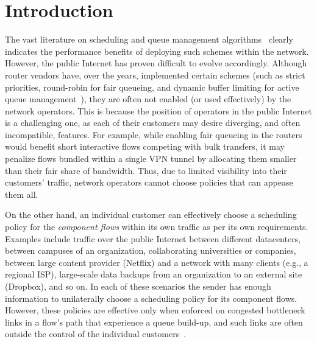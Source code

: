 \section{Introduction}\label{s:intro}



The vast literature on scheduling and queue management algorithms~\cite{diffserv, fair-queueing, sfq, pie, CoDel, fifoplus, virtualClocks, csfq, drr, red, ecn} clearly indicates the performance benefits of deploying such schemes within the network. However, the public Internet has proven difficult to evolve accordingly. Although router vendors have, over the years, implemented certain schemes (such as strict priorities, round-robin for fair queueing, and dynamic buffer limiting for active queue management~\cite{cisco-qos}), they are often not enabled (or used effectively) by the network operators. 
This is because the position of operators in the public Internet is a challenging one, as each of their customers may desire diverging, and often incompatible, features. For example, while enabling fair queueing in the routers would benefit short interactive flows competing with bulk transfers, it may penalize flows bundled within a single VPN tunnel by allocating them smaller than their fair share of bandwidth. %
Thus, due to limited visibility into their customers' traffic, network operators cannot choose policies that can appease them all. 

On the other hand, an individual customer can effectively choose a scheduling policy for the \emph{component flows} within its own traffic as per its own requirements. 
Examples include traffic over the public Internet between different datacenters, between campuses of an organization, collaborating universities or companies, between large content provider (\eg Netflix) and a network with many clients (e.g., a regional ISP), large-scale data backups from an organization to an external site (\eg Dropbox), and so on. 
In each of these scenarios the sender has enough information to unilaterally choose a scheduling policy for its component flows. However, these policies are effective only when enforced on congested bottleneck links in a flow's path that experience a queue build-up, and such links are often outside the control of the individual customers~\cite{inferring-interdomain-congestion}. 

